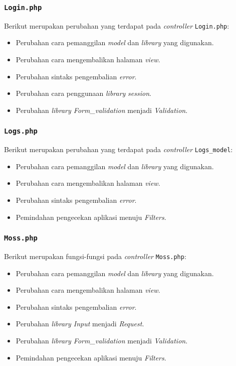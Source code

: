 \subsubsection{\texttt{Login.php}}
Berikut merupakan perubahan yang terdapat pada \textit{controller} \texttt{Login.php}:
\begin{itemize}
	\item Perubahan cara pemanggilan \textit{model} dan \textit{library} yang digunakan.
	\item Perubahan cara mengembalikan halaman \textit{view}.
	\item Perubahan sintaks pengembalian \textit{error}.
	\item Perubahan cara penggunaan \textit{library} \textit{session}.
	\item Perubahan \textit{library Form\_validation} menjadi \textit{Validation}.
\end{itemize}
\subsubsection{\texttt{Logs.php}}
Berikut merupakan perubahan yang terdapat pada \textit{controller} \texttt{Logs\_model}:
\begin{itemize}
	\item Perubahan cara pemanggilan \textit{model} dan \textit{library} yang digunakan.
	\item Perubahan cara mengembalikan halaman \textit{view}.
	\item Perubahan sintaks pengembalian \textit{error}.
	\item Pemindahan pengecekan aplikasi menuju \textit{Filters}.
\end{itemize}
\subsubsection{\texttt{Moss.php}}
Berikut merupakan fungsi-fungsi pada \textit{controller} \texttt{Moss.php}:
\begin{itemize}
	\item Perubahan cara pemanggilan \textit{model} dan \textit{library} yang digunakan.
	\item Perubahan cara mengembalikan halaman \textit{view}.
	\item Perubahan sintaks pengembalian \textit{error}.
	\item Perubahan \textit{library Input} menjadi \textit{Request}.
	\item Perubahan \textit{library Form\_validation} menjadi \textit{Validation}.
	\item Pemindahan pengecekan aplikasi menuju \textit{Filters}.
\end{itemize}

